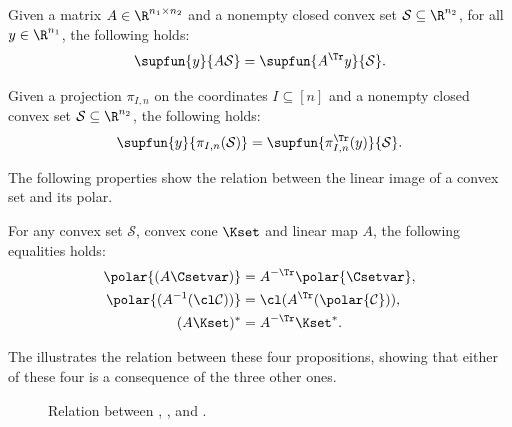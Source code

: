 \documentclass[11pt,twoside,a4paper,openright]{uclouvain-thesis}
\newcommand{\verteq}{\rotatebox{90}{$=$}}
\newcommand{\Cset}{\mathcal{C}}
\DeclareMathOperator{\gauge}{g}
\begin{document}
\begin{myprop}
  \label{prop:hA}
  Given a matrix $A \in \R^{n_1 \times n_2}$ and a nonempty closed convex
  set $\mathcal{S} \subseteq \R^{n_2}$, for all $y \in \R^{n_1}$,
  the following holds:
  \begin{equation}
    \label{eq:hA}
    \supfun{y}{A\mathcal{S}} = \supfun{A^\Tr y}{\mathcal{S}}.
  \end{equation}
\end{myprop}

\begin{mycoro}
  \label{coro:supproj}
  Given a projection $\pi_{I, n}$ on the coordinates $I \subseteq [n]$
  and a nonempty closed convex
  set $\mathcal{S} \subseteq \R^{n_2}$, the following holds:
  \begin{equation*}
    \supfun{y}{\pi_{I, n}(\mathcal{S})} = \supfun{\pi_{I, n}^\Tr(y)}{\mathcal{S}}.
  \end{equation*}
\end{mycoro}

The following properties show the relation between the linear image of a convex set and its polar.
\begin{myprop}
  \label{prop:podu}
  For any convex set $\mathcal{S}$, convex cone $\Kset$ and linear map $A$,
  the following equalities holds:
  \begin{align*}
    \polar{(A\Csetvar)} & = A^{-\Tr} \polar{\Csetvar},\\
    \polar{(A^{-1}(\cl \Cset))} & = \cl(A^\Tr(\polar{\Cset})),\\
    (A\Kset)^* & = A^{-\Tr} \Kset^*.
  \end{align*}
\end{myprop}

The  illustrates the relation between these four propositions, showing that either of these four is a consequence of the three other ones.

\begin{figure}[!ht]
  \centering
  \caption{Relation between , ,  and .}
  \label{fig:polar_image}
\end{figure}
\end{document}
